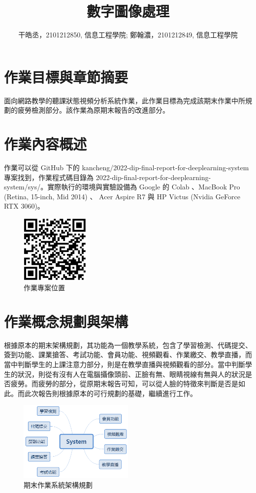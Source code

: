 \documentclass[10pt,UTF8]{ctexart}
\title{數字圖像處理}
\author{干皓丞，2101212850, 信息工程學院; 鄭翰濃，2101212849, 信息工程學院}
\begin{document}
\maketitle

\section{作業目標與章節摘要}

面向網路教學的聽課狀態視頻分析系統作業，此作業目標為完成該期末作業中所規劃的疲勞檢測部分。該作業為原期末報告的改進部分。

\section{作業內容概述}

作業可以從 GitHub 下的 kancheng/2022-dip-final-report-for-deeplearning-system
 專案找到，作業程式碼目錄為 2022-dip-final-report-for-deeplearning-system/sys/。實際執行的環境與實驗設備為 Google 的 Colab 、MacBook Pro (Retina, 15-inch, Mid 2014) 、 Acer Aspire R7 與 HP Victus (Nvidia GeForce RTX 3060)。

\begin{figure}[H]
\centering 
\includegraphics[width=0.30\textwidth]{dip-final-qr.png} 
\caption{作業專案位置}
\label{Test}
\end{figure}

\section{作業概念規劃與架構}

根據原本的期末架構規劃，其功能為一個教學系統，包含了學習檢測、代碼提交、簽到功能、課業搶答、考試功能、會員功能、視頻觀看、作業繳交、教學直播，而當中判斷學生的上課注意力部分，則是在教學直播與視頻觀看的部分。當中判斷學生的狀況，則從有沒有人在電腦攝像頭前、正臉有無、眼睛視線有無與人的狀況是否疲勞。而疲勞的部分，從原期末報告可知，可以從人臉的特徵來判斷是否是如此。而此次報告則根據原本的可行規劃的基礎，繼續進行工作。

\begin{figure}[H]
\centering 
\includegraphics[width=0.50\textwidth]{ch1m1.png} 
\caption{期末作業系統架構規劃}
\label{Test}
\end{figure}
\end{document}
